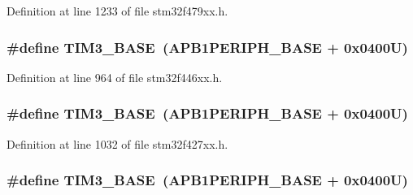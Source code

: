 Definition at line 1233 of file stm32f479xx.\+h.

\subsubsection[{\texorpdfstring{T\+I\+M3\+\_\+\+B\+A\+SE}{TIM3_BASE}}]{\setlength{\rightskip}{0pt plus 5cm}\#define T\+I\+M3\+\_\+\+B\+A\+SE~({\bf A\+P\+B1\+P\+E\+R\+I\+P\+H\+\_\+\+B\+A\+SE} + 0x0400\+U)}\hypertarget{group___peripheral__memory__map_gaf0c34a518f87e1e505cd2332e989564a}{}\label{group___peripheral__memory__map_gaf0c34a518f87e1e505cd2332e989564a}


Definition at line 964 of file stm32f446xx.\+h.

\subsubsection[{\texorpdfstring{T\+I\+M3\+\_\+\+B\+A\+SE}{TIM3_BASE}}]{\setlength{\rightskip}{0pt plus 5cm}\#define T\+I\+M3\+\_\+\+B\+A\+SE~({\bf A\+P\+B1\+P\+E\+R\+I\+P\+H\+\_\+\+B\+A\+SE} + 0x0400\+U)}\hypertarget{group___peripheral__memory__map_gaf0c34a518f87e1e505cd2332e989564a}{}\label{group___peripheral__memory__map_gaf0c34a518f87e1e505cd2332e989564a}


Definition at line 1032 of file stm32f427xx.\+h.

\subsubsection[{\texorpdfstring{T\+I\+M3\+\_\+\+B\+A\+SE}{TIM3_BASE}}]{\setlength{\rightskip}{0pt plus 5cm}\#define T\+I\+M3\+\_\+\+B\+A\+SE~({\bf A\+P\+B1\+P\+E\+R\+I\+P\+H\+\_\+\+B\+A\+SE} + 0x0400\+U)}\hypertarget{group___peripheral__memory__map_gaf0c34a518f87e1e505cd2332e989564a}{}\label{group___peripheral__memory__map_gaf0c34a518f87e1e505cd2332e989564a}


